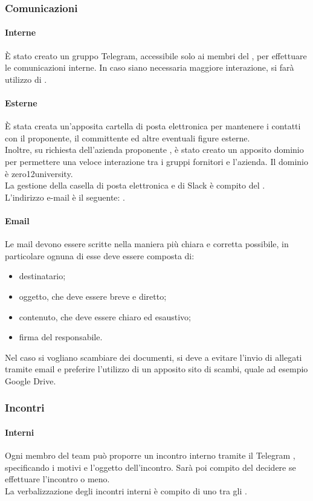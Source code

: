 \subsubsection{Comunicazioni}
 \paragraph{Interne}
 È stato creato un gruppo Telegram, accessibile solo ai membri del , per effettuare le comunicazioni interne. In caso siano necessaria maggiore interazione, si farà utilizzo di . 
 \paragraph{Esterne}
 È stata creata un'apposita cartella di posta elettronica per mantenere i contatti con il proponente, il committente ed altre eventuali figure esterne.\\
  Inoltre, su richiesta dell'azienda proponente \PROPONENTE, è stato creato un apposito dominio  per permettere una veloce interazione tra i gruppi fornitori e l'azienda. Il dominio è zero12university. \\
 La gestione della casella di posta elettronica e di Slack è compito del \RESP. \\
 L'indirizzo e-mail è il seguente: \EMAIL.
 \paragraph{Email}
 Le mail devono essere scritte nella maniera più chiara e corretta possibile, in particolare ognuna di esse deve essere composta di:
 \begin{itemize}
 	\item destinatario;
 	\item oggetto, che deve essere breve e diretto;
	\item contenuto, che deve essere chiaro ed esaustivo;
	\item firma del responsabile.
 \end{itemize}
 Nel caso si vogliano scambiare dei documenti, si deve a evitare l'invio di allegati tramite email e preferire l'utilizzo di un apposito sito di scambi, quale ad esempio Google Drive.
\subsubsection{Incontri}
 \paragraph{Interni}
 Ogni membro del team può proporre un incontro interno tramite il  Telegram , specificando i motivi e l'oggetto dell'incontro. 
 Sarà poi compito del \RESP{} decidere se effettuare l'incontro o meno.\\
  La verbalizzazione degli incontri interni è compito di uno tra gli \AMMP.
